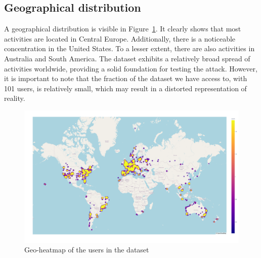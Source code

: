 \documentclass[conference]{IEEEtran}
\begin{document}
\subsection{Geographical distribution}
A geographical distribution is visible in Figure~\ref{fig:heatmap}. It clearly
shows that most activities are located in Central Europe. Additionally, there
is a noticeable concentration in the United States. To a lesser extent, there
are also activities in Australia and South America. The dataset exhibits a
relatively broad spread of activities worldwide, providing a solid foundation
for testing the attack. However, it is important to note that the fraction of
the dataset we have access to, with 101 users, is relatively small, which may
result in a distorted representation of reality.
\begin{figure}[h]
    \centering
    \includegraphics[width=0.85\linewidth]{fig/Afwijkingen&Analyses/Heatmap.png}
    \caption{Geo-heatmap of the users in the dataset}\label{fig:heatmap}
\end{figure}
\end{document}
